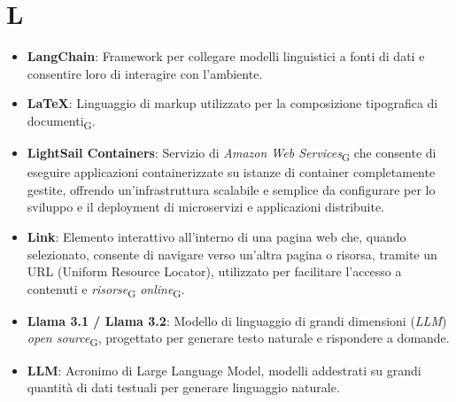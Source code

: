 \section{L}
\begin{itemize}
    \item \textbf{LangChain}: Framework per collegare modelli linguistici a fonti di dati e consentire loro di interagire con l'ambiente.
    \item \textbf{LaTeX}: Linguaggio di markup utilizzato per la composizione tipografica di documenti\textsubscript{G}.
    \item \textbf{LightSail Containers}: Servizio di \textit{Amazon Web Services}\textsubscript{G} che consente di eseguire applicazioni containerizzate su istanze di container completamente gestite, offrendo un'infrastruttura scalabile e semplice da configurare per lo sviluppo e il deployment di microservizi e applicazioni distribuite.
    \item \textbf{Link}: Elemento interattivo all'interno di una pagina web che, quando selezionato, consente di navigare verso un'altra pagina o risorsa, tramite un URL (Uniform Resource Locator), utilizzato per facilitare l'accesso a contenuti e \textit{risorse}\textsubscript{G} \textit{online}\textsubscript{G}.
    \item \textbf{Llama 3.1 / Llama 3.2}: Modello di linguaggio di grandi dimensioni (\textit{LLM}) \textit{open source}\textsubscript{G}, progettato per generare testo naturale e rispondere a domande.
    \item \textbf{LLM}: Acronimo di Large Language Model, modelli addestrati su grandi quantità di dati testuali per generare linguaggio naturale.
\end{itemize}
